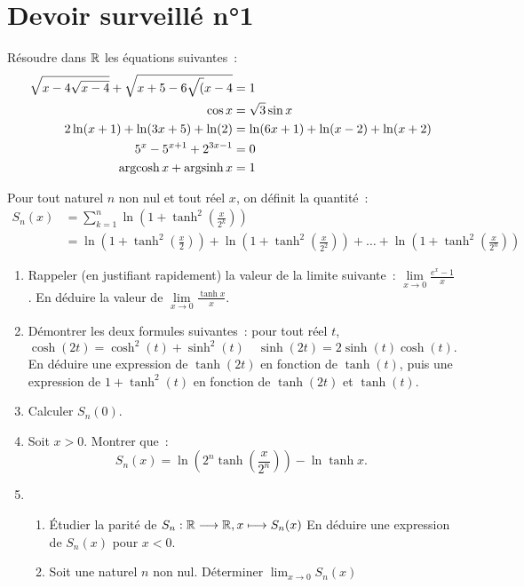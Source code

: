 \chapter{Devoir surveillé n°1}
\label{chap:DS1}
\begin{exercice}
    Résoudre dans \(\mathbb{R}\) les équations suivantes~:
    \begin{align}
        \sqrt{x-4\sqrt{x-4}} + \sqrt{x+5-6\sqrt({x-4}} & = 1 \\
                                                \cos x & = \sqrt{3} \sin x \\
                       2 \ln(x+1) + \ln(3x+5) + \ln(2) & = \ln(6x+1)+\ln(x-2)+\ln(x+2) \\
                              5^x - 5^{x+1} + 2^{3x-1} & = 0 \\
                                   \operatorname{argcosh} x + \operatorname{argsinh} x & = 1
    \end{align}
\end{exercice}
\begin{exercice}
    Pour tout naturel \(n\) non nul et tout réel \(x\), on définit la quantité~:
    \begin{align}
        S_n(x) &= \sum_{k=1}^n \ln\left(1+ \tanh^2\left(\frac{x}{2^k}\right)\right) \\
               &= \ln\left(1+ \tanh^2\left(\frac{x}{2}\right)\right) + \ln\left(1+ \tanh^2\left(\frac{x}{2^2}\right)\right) + \ldots + \ln\left(1+ \tanh^2\left(\frac{x}{2^n}\right)\right) 
    \end{align}
    \begin{enumerate}
        \item Rappeler (en justifiant rapidement) la valeur de la limite suivante~: \(\lim\limits_{x\to 0} \frac{e^x-1}{x}\). En déduire la valeur de \(\lim\limits_{x\to 0} \frac{\tanh x}{x}\).
        \item Démontrer les deux formules suivantes~: pour tout réel \(t\),
            \begin{equation}
                \cosh(2t) = \cosh^2(t) + \sinh^2(t) \quad \sinh(2t) = 2\sinh(t)\cosh(t).
            \end{equation}
            En déduire une expression de \(\tanh(2t)\) en fonction de \(\tanh(t)\), puis une expression de \(1+\tanh^2(t)\) en fonction de \(\tanh(2t)\) et \(\tanh(t)\).
        \item Calculer \(S_n(0)\).
        \item Soit \(x >0\). Montrer que~:
            \begin{equation}
                S_n(x) = \ln\left(2^n \tanh\left(\frac{x}{2^n}\right)\right) - \ln \tanh x.
            \end{equation}
        \item \begin{enumerate}
                \item Étudier la parité de \(S_n:\mathbb{R} \longrightarrow \mathbb{R}, x \longmapsto S_n(x)\) En déduire une expression de \(S_n(x)\) pour \(x<0\).
                \item Soit une naturel \(n\) non nul. Déterminer \(\lim_{x\to 0} S_n(x)\)
            \end{enumerate}
    \end{enumerate}
\end{exercice}
